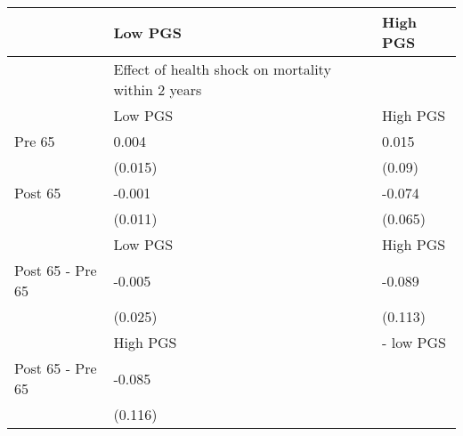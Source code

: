 % 
\begin{tabular}{lll}
  \hline
 & Low PGS & High PGS \\ 
  \hline
 & Effect of health shock on mortality within 2 years &  \\ 
   & Low PGS & High PGS \\ 
  Pre 65 & 0.004 & 0.015 \\ 
   & (0.015) & (0.09) \\ 
  Post 65 & -0.001 & -0.074 \\ 
   & (0.011) & (0.065) \\ 
   & Low PGS & High PGS \\ 
  Post 65 - Pre 65 & -0.005 & -0.089 \\ 
   & (0.025) & (0.113) \\ 
   & High PGS  & - low PGS \\ 
  Post 65 - Pre 65 & -0.085 &  \\ 
   & (0.116) &  \\ 
   \hline
\end{tabular}
